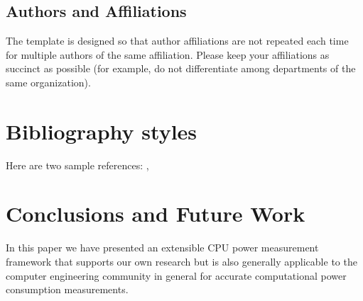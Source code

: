 \subsection{Authors and Affiliations}
The template is designed so that author affiliations are not repeated each time for multiple authors of the same affiliation. Please keep your affiliations as succinct as possible (for example, do not differentiate among departments of the same organization). 
\section{Bibliography styles}
Here are two sample references:
\cite{gong2021depth}, \cite{murthy2020blockchain}
\section{Conclusions and Future Work}
\label{sec:conclusions_and_future_work}

In this paper we have presented an extensible CPU power measurement framework that supports our own research but is also generally applicable to the computer engineering community in general for accurate computational power consumption measurements.  

